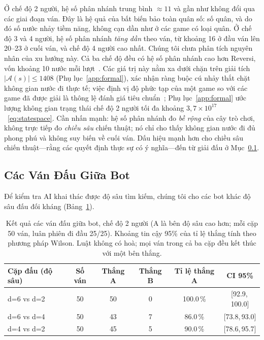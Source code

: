 \noindent Ở chế độ 2 người, hệ số phân nhánh trung bình $\approx 11$ và gần
như không đổi qua các giai đoạn ván. Đây là hệ quả của bất biến bảo toàn
quân số: số quân, và do đó số nước nhảy tiềm năng, không cạn dần như ở các
game có loại quân. Ở chế độ 3 và 4 người, hệ số phân nhánh \emph{tăng dần}
theo ván, từ khoảng 16 ở đầu ván lên 20--23 ở cuối ván, và chế độ 4 người
cao nhất. Chúng tôi chưa phân tích nguyên nhân của xu hướng này. Cả ba chế
độ đều có hệ số phân nhánh cao hơn Reversi, vốn khoảng 10 nước mỗi
lượt~\citep{allis1994searching}. Các giá trị này nằm xa dưới chặn trên giải
tích $|\mathcal A(s)|\le 1408$ (Phụ lục~\ref{app:formal}), xác nhận ràng buộc
cú nhảy thắt chặt không gian nước đi thực tế; việc định vị độ phức tạp của
một game so với các game đã được giải là thông lệ đánh giá tiêu
chuẩn~\citep{herik2002games}; Phụ lục~\ref{app:formal} ước lượng không gian
trạng thái chế độ 2 người tối đa khoảng $3{,}7\times10^{17}$~\eqref{eq:statespace}. Cần nhấn mạnh: hệ số phân nhánh đo \emph{bề
rộng} của cây trò chơi, không trực tiếp đo \emph{chiều sâu} chiến thuật; nó
chỉ cho thấy không gian nước đi đủ phong phú và không suy biến về cuối ván.
Dấu hiệu mạnh hơn cho chiều sâu chiến thuật---rằng các quyết định thực sự có ý
nghĩa---đến từ giải đấu ở Mục~\ref{sec:eval_tournament}.

\subsection{Các Ván Đấu Giữa Bot}
\label{sec:eval_tournament}

Để kiểm tra AI khai thác được độ sâu tìm kiếm, chúng tôi cho các bot
khác độ sâu đấu đối kháng (Bảng~\ref{tab:tournament}).

\begin{table}[H]
  \centering
  \caption{Kết quả các ván đấu giữa bot, chế độ 2 người (A là bên độ sâu cao hơn;
  mỗi cặp 50 ván, luân phiên đi đầu 25/25). Khoảng tin cậy 95\% của
  tỉ lệ thắng tính theo phương pháp Wilson. Luật không có hoà; mọi ván trong
  cả ba cặp đều kết thúc với một bên thắng.}
  \label{tab:tournament}
  \setlength{\tabcolsep}{4.5pt}
  \begin{tabular}{lccccc}
    \toprule
    \textbf{Cặp đấu (độ sâu)} & \textbf{Số ván} & \textbf{Thắng A}
      & \textbf{Thắng B} & \textbf{Tỉ lệ thắng A}
      & \textbf{CI 95\%} \\
    \midrule
    d=6 vs d=2 & 50 & 50 & 0 & 100.0\,\% & [92.9,\,100.0] \\
    d=6 vs d=4 & 50 & 43 & 7 & 86.0\,\% & [73.8,\,93.0] \\
    d=4 vs d=2 & 50 & 45 & 5 & 90.0\,\% & [78.6,\,95.7] \\
    \bottomrule
  \end{tabular}
\end{table}

